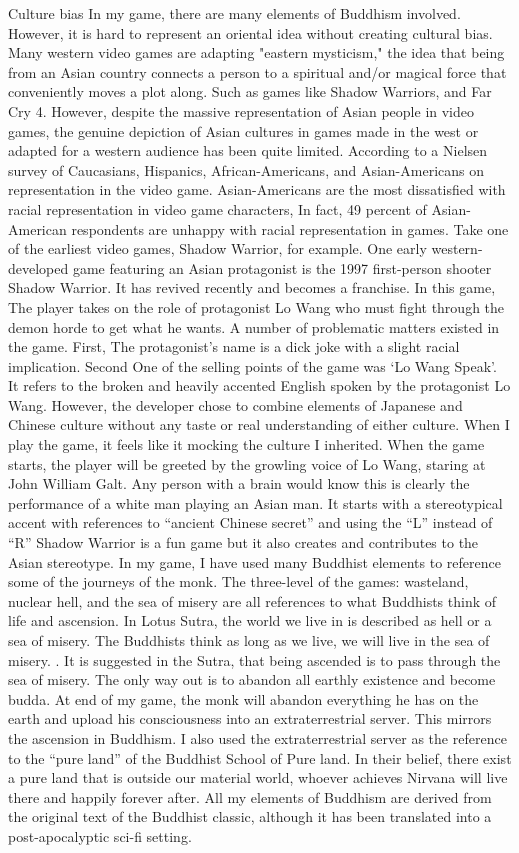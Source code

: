 \documentclass[10pt,twocolumn]{article}
\begin{document}
 
Culture bias
In my game, there are many elements of Buddhism involved. However, it is hard to represent an oriental idea without creating cultural bias. Many western video games are adapting "eastern mysticism," the idea that being from an Asian country connects a person to a spiritual and/or magical force that conveniently moves a plot along. Such as games like Shadow Warriors, and Far Cry 4.  However, despite the massive representation of Asian people in video games, the genuine depiction of Asian cultures in games made in the west or adapted for a western audience has been quite limited. 
According to a Nielsen survey of Caucasians, Hispanics, African-Americans, and Asian-Americans on representation in the video game. Asian-Americans are the most dissatisfied with racial representation in video game characters, In fact, 49 percent of Asian-American respondents are unhappy with racial representation in games. Take one of the earliest video games, Shadow Warrior, for example. 
One early western-developed game featuring an Asian protagonist is the 1997 first-person shooter Shadow Warrior. It has revived recently and becomes a franchise. In this game, The player takes on the role of protagonist Lo Wang who must fight through the demon horde to get what he wants. 
A number of problematic matters existed in the game. First, The protagonist’s name is a dick joke with a slight racial implication. Second One of the selling points of the game was  ‘Lo Wang Speak’. It refers to the broken and heavily accented English spoken by the protagonist Lo Wang.  However, the developer chose to combine elements of Japanese and Chinese culture without any taste or real understanding of either culture. When I play the game, it feels like it mocking the culture I inherited. When the game starts, the player will be greeted by the growling voice of Lo Wang, staring at John William Galt. Any person with a brain would know this is clearly the performance of a white man playing an Asian man. It starts with a stereotypical accent with references to “ancient Chinese secret” and using the “L” instead of “R” Shadow Warrior is a fun game but it also creates and contributes to the Asian stereotype. 
In my game, I have used many Buddhist elements to reference some of the journeys of the monk. The three-level of the games: wasteland, nuclear hell, and the sea of misery are all 
 references to what Buddhists think of life and ascension. In Lotus Sutra, the world we live in is described as hell or a sea of misery. The Buddhists think as long as we live, we will live in the sea of misery. . It is suggested in the Sutra, that being ascended is to pass through the sea of misery. The only way out is to abandon all earthly existence and become budda. At end of my game, the monk will abandon everything he has on the earth and upload his consciousness into an extraterrestrial server. This mirrors the ascension in Buddhism.
 I  also used the extraterrestrial server as the reference to the “pure land” of the Buddhist School of Pure land. In their belief, there exist a pure land that is outside our material world, whoever achieves Nirvana will live there and happily forever after. All my elements of Buddhism are derived from the original text of the Buddhist classic, although it has been translated into a post-apocalyptic sci-fi setting.
\end{document}
